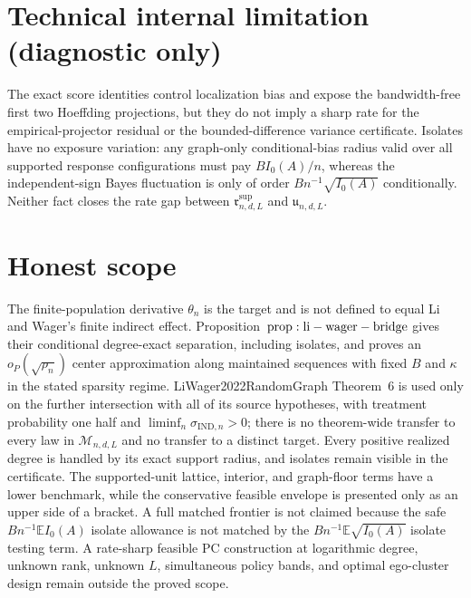 \documentclass{article}
\begin{document}
\section*{Technical internal limitation (diagnostic only)}

The exact score identities control localization bias and expose the bandwidth-free first two Hoeffding projections, but they do not imply a sharp rate for the empirical-projector residual or the bounded-difference variance certificate.  Isolates have no exposure variation: any graph-only conditional-bias radius valid over all supported response configurations must pay \(BI_0(A)/n\), whereas the independent-sign Bayes fluctuation is only of order \(Bn^{-1}\sqrt{I_0(A)}\) conditionally.  Neither fact closes the rate gap between \(\mathfrak r^{\mathrm{sup}}_{n,d,L}\) and \(\mathfrak u_{n,d,L}\).

\section{Honest scope}

The finite-population derivative \(\theta_n\) is the target and is not defined to equal Li and Wager's finite indirect effect. Proposition~\({\rm prop:li-wager-bridge}\) gives their conditional degree-exact separation, including isolates, and proves an \(o_P(\sqrt{\rho_n})\) center approximation along maintained sequences with fixed \(B\) and \(\kappa\) in the stated sparsity regime. LiWager2022RandomGraph Theorem~6 is used only on the further intersection with all of its source hypotheses, with treatment probability one half and \(\liminf_n\sigma_{\mathrm{IND},n}>0\); there is no theorem-wide transfer to every law in \(\mathcal M_{n,d,L}\) and no transfer to a distinct target. Every positive realized degree is handled by its exact support radius, and isolates remain visible in the certificate. The supported-unit lattice, interior, and graph-floor terms have a lower benchmark, while the conservative feasible envelope is presented only as an upper side of a bracket. A full matched frontier is not claimed because the safe \(Bn^{-1}\mathbb E I_0(A)\) isolate allowance is not matched by the \(Bn^{-1}\mathbb E\sqrt{I_0(A)}\) isolate testing term. A rate-sharp feasible PC construction at logarithmic degree, unknown rank, unknown \(L\), simultaneous policy bands, and optimal ego-cluster design remain outside the proved scope.
\end{document}
